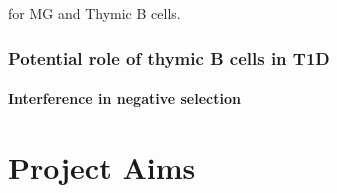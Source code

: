   \citep{Christensson1998} for MG and Thymic B cells.

\subsubsection{Potential role of thymic B cells in T1D}

\paragraph{Interference in negative selection}



\section{Project Aims}


































